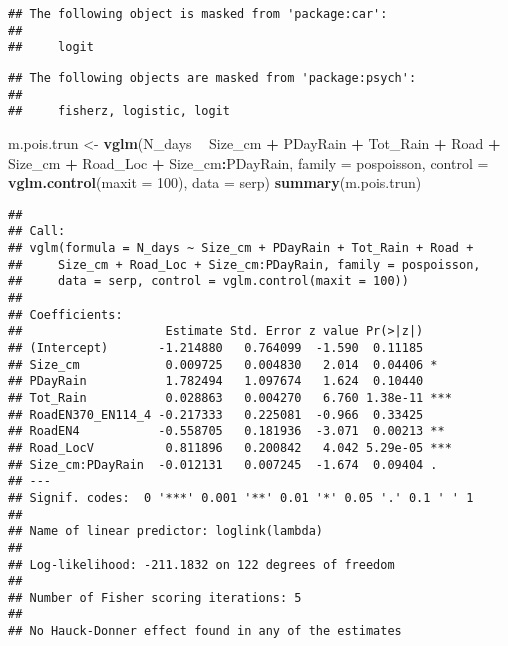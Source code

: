 \documentclass[
]{book}
\newenvironment{Shaded}{\begin{snugshade}}{\end{snugshade}}
\newcommand{\DataTypeTok}[1]{\textcolor[rgb]{0.13,0.29,0.53}{#1}}
\newcommand{\DecValTok}[1]{\textcolor[rgb]{0.00,0.00,0.81}{#1}}
\newcommand{\KeywordTok}[1]{\textcolor[rgb]{0.13,0.29,0.53}{\textbf{#1}}}
\newcommand{\NormalTok}[1]{#1}
\newcommand{\OperatorTok}[1]{\textcolor[rgb]{0.81,0.36,0.00}{\textbf{#1}}}
\newcommand{\StringTok}[1]{\textcolor[rgb]{0.31,0.60,0.02}{#1}}
\begin{document}
\begin{verbatim}
## The following object is masked from 'package:car':
## 
##     logit
\end{verbatim}

\begin{verbatim}
## The following objects are masked from 'package:psych':
## 
##     fisherz, logistic, logit
\end{verbatim}

\begin{Shaded}
\begin{Highlighting}[]
\NormalTok{m.pois.trun <-}\StringTok{ }\KeywordTok{vglm}\NormalTok{(N_days }\OperatorTok{~}\StringTok{ }\NormalTok{Size_cm }\OperatorTok{+}\StringTok{ }\NormalTok{PDayRain }\OperatorTok{+}\StringTok{ }\NormalTok{Tot_Rain }\OperatorTok{+}\StringTok{ }\NormalTok{Road }\OperatorTok{+}\StringTok{ }\NormalTok{Size_cm }\OperatorTok{+}\StringTok{ }\NormalTok{Road_Loc }\OperatorTok{+}\StringTok{ }\NormalTok{Size_cm}\OperatorTok{:}\NormalTok{PDayRain, }\DataTypeTok{family =}\NormalTok{ pospoisson, }\DataTypeTok{control =}  \KeywordTok{vglm.control}\NormalTok{(}\DataTypeTok{maxit =} \DecValTok{100}\NormalTok{), }\DataTypeTok{data =}\NormalTok{ serp)}
\KeywordTok{summary}\NormalTok{(m.pois.trun)}
\end{Highlighting}
\end{Shaded}

\begin{verbatim}
## 
## Call:
## vglm(formula = N_days ~ Size_cm + PDayRain + Tot_Rain + Road + 
##     Size_cm + Road_Loc + Size_cm:PDayRain, family = pospoisson, 
##     data = serp, control = vglm.control(maxit = 100))
## 
## Coefficients: 
##                    Estimate Std. Error z value Pr(>|z|)    
## (Intercept)       -1.214880   0.764099  -1.590  0.11185    
## Size_cm            0.009725   0.004830   2.014  0.04406 *  
## PDayRain           1.782494   1.097674   1.624  0.10440    
## Tot_Rain           0.028863   0.004270   6.760 1.38e-11 ***
## RoadEN370_EN114_4 -0.217333   0.225081  -0.966  0.33425    
## RoadEN4           -0.558705   0.181936  -3.071  0.00213 ** 
## Road_LocV          0.811896   0.200842   4.042 5.29e-05 ***
## Size_cm:PDayRain  -0.012131   0.007245  -1.674  0.09404 .  
## ---
## Signif. codes:  0 '***' 0.001 '**' 0.01 '*' 0.05 '.' 0.1 ' ' 1
## 
## Name of linear predictor: loglink(lambda) 
## 
## Log-likelihood: -211.1832 on 122 degrees of freedom
## 
## Number of Fisher scoring iterations: 5 
## 
## No Hauck-Donner effect found in any of the estimates
\end{verbatim}
\end{document}
